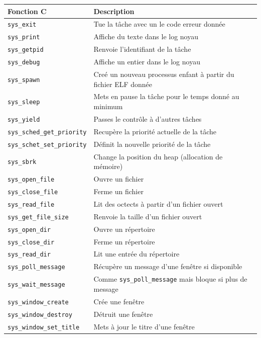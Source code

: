 \documentclass[french, 12pt]{article}
\begin{document}
\begin{table}[]
\label{syscall_table}
\centering
\begin{tabular}{@{}ll@{}}
\toprule
Fonction C  & Description \\ \midrule
\texttt{sys\_exit}   & Tue la tâche avec un le code erreur donnée \\
\texttt{sys\_print}  & Affiche du texte dans le log noyau \\
\texttt{sys\_getpid}  & Renvoie l'identifiant de la tâche \\
\texttt{sys\_debug}  & Affiche un entier dans le log noyau \\
\texttt{sys\_spawn}  & Creé un nouveau processus enfant à partir du fichier ELF donnée \\
\texttt{sys\_sleep}  & Mets en pause la tâche pour le temps donné au minimum \\
\texttt{sys\_yield}  & Passes le contrôle à d'autres tâches \\
\texttt{sys\_sched\_get\_priority}  & Recupère la priorité actuelle de la tâche \\
\texttt{sys\_schet\_set\_priority}  & Définit la nouvelle priorité de la tâche \\
\texttt{sys\_sbrk}  & Change la position du heap (allocation de mémoire) \\
\texttt{sys\_open\_file} & Ouvre un fichier \\
\texttt{sys\_close\_file} & Ferme un fichier \\
\texttt{sys\_read\_file} & Lit des octects à partir d'un fichier ouvert \\
\texttt{sys\_get\_file\_size} & Renvoie la taille d'un fichier ouvert \\
\texttt{sys\_open\_dir} & Ouvre un répertoire \\
\texttt{sys\_close\_dir} & Ferme un répertoire \\
\texttt{sys\_read\_dir} & Lit une entrée du répertoire \\
\texttt{sys\_poll\_message} & Récupère un message d'une fenêtre si disponible \\
\texttt{sys\_wait\_message} & Comme \texttt{sys\_poll\_message} mais bloque si plus de message \\
\texttt{sys\_window\_create} & Crée une fenêtre \\
\texttt{sys\_window\_destroy} & Détruit une fenêtre \\
\texttt{sys\_window\_set\_title} & Mets à jour le titre d'une fenêtre \\

\end{tabular}
\end{table}
\end{document}
